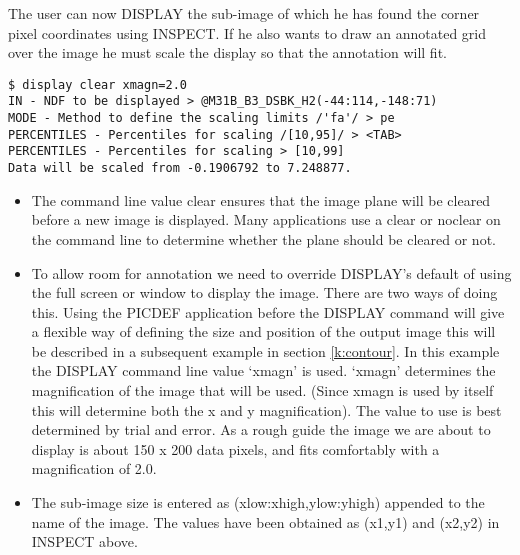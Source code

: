 The user can now DISPLAY the sub-image of which he has found the corner pixel
coordinates using INSPECT. If he also wants to draw an annotated grid over 
the image he must scale the display so that the annotation will fit.
\begin{small}
\begin{verbatim}
$ display clear xmagn=2.0
IN - NDF to be displayed > @M31B_B3_DSBK_H2(-44:114,-148:71)
MODE - Method to define the scaling limits /'fa'/ > pe
PERCENTILES - Percentiles for scaling /[10,95]/ > <TAB>
PERCENTILES - Percentiles for scaling > [10,99]
Data will be scaled from -0.1906792 to 7.248877.
\end{verbatim}
\end{small}

\begin{itemize}
\item The command line value clear ensures that the image plane will be 
cleared before a new image is displayed. Many applications use a clear or 
noclear on the command line to determine whether the plane should be 
cleared or not.
\item To allow room for annotation we need to override DISPLAY's default of
using the full screen or window to display the image. There are two ways of
doing this. Using the PICDEF application before the DISPLAY command will give a
flexible way of defining the size and position of the output image this will be
described in a subsequent example in section \ref{k:contour}. In this example
the DISPLAY command line value `xmagn' is used.  `xmagn' determines the
magnification of the image that will be used. (Since xmagn is used by itself
this will determine both the x and y magnification). The value to use is best
determined by trial and error. As a rough guide the image we are about to
display is about 150 x 200 data pixels, and fits comfortably with a
magnification of 2.0.
\item The sub-image size is entered as (xlow:xhigh,ylow:yhigh) appended to  
the name of the image. The values have been obtained as (x1,y1) and (x2,y2) in
INSPECT above. 
\end{itemize}

